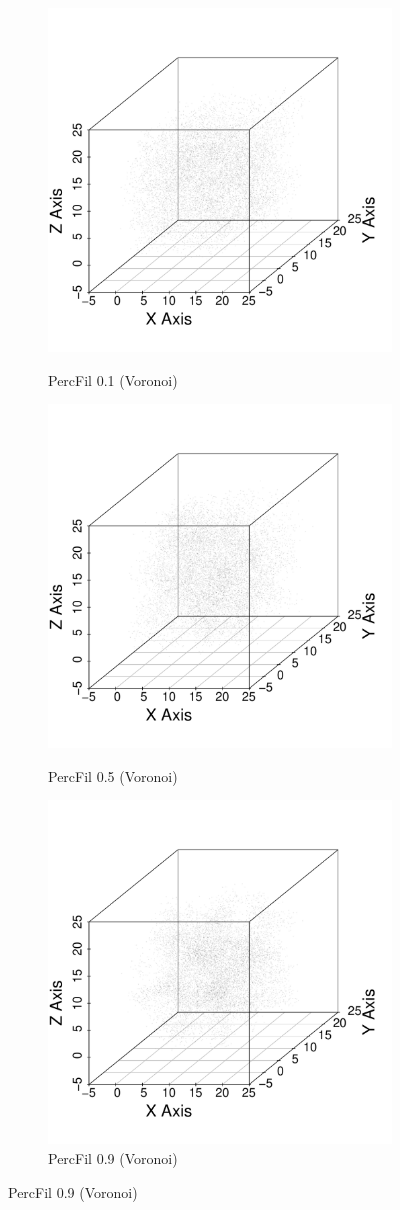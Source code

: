 \documentclass[12pt]{article}
\begin{document}
\begin{center}
  \begin{figure}[htp!]
    \centering
    \begin{subfigure}{.32\textwidth}
      \centering
      \caption{PercFil 0.1 (Voronoi)} 
      \includegraphics[width=0.6\linewidth]{figure_7_plot_pf_0_1.pdf}
      \label{fig:percfil01voronoi}
    \end{subfigure}
      \begin{subfigure}{.32\textwidth}
      \centering
      \caption{PercFil 0.5 (Voronoi)} 
      \includegraphics[width=0.6\linewidth]{figure_7_plot_pf_0_5.pdf}
      \label{fig:percfil09voronoi}
    \end{subfigure}
      \begin{subfigure}{.32\textwidth}
      \centering
      \caption{PercFil 0.9 (Voronoi)} 
      \includegraphics[width=0.6\linewidth]{figure_7_plot_pf_0_9.pdf}

\end{subfigure}
\end{figure}
\end{center}
\end{document}
